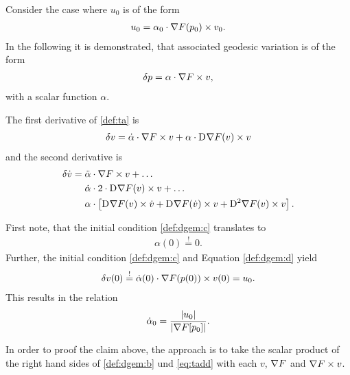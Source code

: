 Consider the case where $ u_0 $ is of the form
\begin{align}
    u_0  =  \alpha_0 \cdot \nabla F( p_0 ) \times v_0 .
\end{align}
In the following it is demonstrated,
that associated geodesic variation is of the form
\begin{align}
    \delta p  =  \alpha \cdot \nabla F  \times v ,
    \label{def:ta}
\end{align}
with a scalar function $ \alpha $.



The first derivative of \eqref{def:ta} is
\begin{align}
    \delta v  =
    \dot{ \alpha } \cdot \nabla F  \times v  +
    \alpha \cdot \mathrm{D}^{  } \nabla F  ( v ) \times v
    \label{eq:tad}
\end{align}
and the second derivative is
\begin{align}
    \vardiff \dot{ v }  &=
    \ddot{ \alpha } \mult \grad{ F } \times v  +  \dots\nonumber\\
    &\hphantom{{}={}}\dot{ \alpha } \mult 2 \mult \diff{}{ \grad{ F } }( v ) \times v  +  \dots\nonumber\\
    &\hphantom{{}={}}\alpha \mult \left[ \diff{}{ \grad{ F } }( v ) \times \dot{ v }  +
    \diff{}{ \grad{ F } }( \dot{ v } ) \times v  +  
    \diff{ 2 }{ \grad{ F } }( v ) \times v \right] .
    \label{eq:tadd}
\end{align}


First note, that the initial condition \eqref{def:dgem:c} translates to
\begin{align}
    \alpha( 0 )  \overset{!}{=}  0 .
\end{align}
Further, the initial condition \eqref{def:dgem:c}
and Equation \eqref{def:dgem:d} yield
\begin{align}
    \delta v( 0 )   \overset{!}{=}
    \dot{ \alpha }( 0 ) \cdot \nabla F( p( 0 ) ) \times v( 0 )  =  u_0 .
\end{align}
This results in the relation
\begin{align}
    \dot{ \alpha }_0   =
    \frac{ \lvert  u_0  \rvert }{ \lvert  \nabla F[ p_0 ]  \rvert } .
\end{align}


In order to proof the claim above,
the approach is to take the scalar product
of the right hand sides of \eqref{def:dgem:b} und \eqref{eq:tadd}
with each $ v $, $ \nabla F $ and $ \nabla F \times v $.


